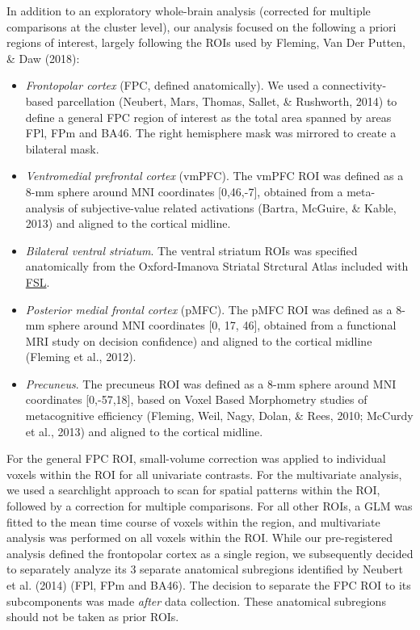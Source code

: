 \documentclass[12pt,twoside]{reedthesis}
\begin{document}
In addition to an exploratory whole-brain analysis (corrected for multiple comparisons at the cluster level), our analysis focused on the following a priori regions of interest, largely following the ROIs used by Fleming, Van Der Putten, \& Daw (2018):
\begin{itemize}
\item
  \emph{Frontopolar cortex} (FPC, defined anatomically). We used a connectivity-based parcellation (Neubert, Mars, Thomas, Sallet, \& Rushworth, 2014) to define a general FPC region of interest as the total area spanned by areas FPl, FPm and BA46. The right hemisphere mask was mirrored to create a bilateral mask.
\item
  \emph{Ventromedial prefrontal cortex} (vmPFC). The vmPFC ROI was defined as a 8-mm sphere around MNI coordinates {[}0,46,-7{]}, obtained from a meta-analysis of subjective-value related activations (Bartra, McGuire, \& Kable, 2013) and aligned to the cortical midline.
\item
  \emph{Bilateral ventral striatum}. The ventral striatum ROIs was specified anatomically from the Oxford-Imanova Striatal Strctural Atlas included with \href{http://fsl.fmrib.ox.ac.uk}{FSL}.
\item
  \emph{Posterior medial frontal cortex} (pMFC). The pMFC ROI was defined as a 8-mm sphere around MNI coordinates {[}0, 17, 46{]}, obtained from a functional MRI study on decision confidence) and aligned to the cortical midline (Fleming et al., 2012).
\item
  \emph{Precuneus}. The precuneus ROI was defined as a 8-mm sphere around MNI coordinates {[}0,-57,18{]}, based on Voxel Based Morphometry studies of metacognitive efficiency (Fleming, Weil, Nagy, Dolan, \& Rees, 2010; McCurdy et al., 2013) and aligned to the cortical midline.
\end{itemize}
For the general FPC ROI, small-volume correction was applied to individual voxels within the ROI for all univariate contrasts. For the multivariate analysis, we used a searchlight approach to scan for spatial patterns within the ROI, followed by a correction for multiple comparisons. For all other ROIs, a GLM was fitted to the mean time course of voxels within the region, and multivariate analysis was performed on all voxels within the ROI.
While our pre-registered analysis defined the frontopolar cortex as a single region, we subsequently decided to separately analyze its 3 separate anatomical subregions identified by Neubert et al. (2014) (FPl, FPm and BA46). The decision to separate the FPC ROI to its subcomponents was made \emph{after} data collection. These anatomical subregions should not be taken as prior ROIs.
\end{document}
